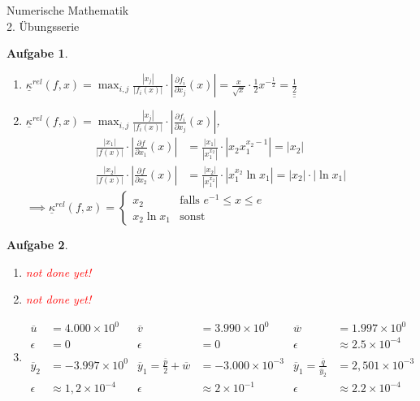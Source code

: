 \documentclass[11pt]{article}
\theoremstyle{break}
\newtheorem{task}{Aufgabe}
\newcommand{\abs}[1]{\ensuremath{\left\vert #1 \right\vert}}
\newcommand{\komp}{\ensuremath{\underline{\kappa}}}
\newcommand{\result}[1]{\ensuremath{\underline{\underline{#1}}}}
\newcommand{\ndy}{
    \textcolor{red} {\hfill not done yet!}
    \reversemarginpar
    \marginpar{\raggedleft\textcolor{red}{\rule{2mm}{2mm}}}
}
\newcommand{\hw}{2}
\begin{document}
\begin{center}
\Large{Numerische Mathematik}\\
\large{\hw. Übungsserie}
\end{center}
\begin{task}
    \hfill\vspace{-5mm}
    \begin{enumerate}[label={(\alph*)}]
        \item $\komp^{rel}(f,x) = \max_{i,j} \frac{\abs{x_j}}{\abs{f_i(x)}}\cdot\abs{\frac{\partial f_i}{\partial x_j}(x)} = \frac{x}{\sqrt{x}}\cdot \frac{1}{2} x^{-\frac{1}{2}}=\result{\frac{1}{2}}$
        \item $\komp^{rel}(f,x) = \max_{i,j} \frac{\abs{x_j}}{\abs{f_i(x)}}\cdot\abs{\frac{\partial f_i}{\partial x_j}(x)}$,
        \begin{align*}
            \frac{\abs{x_1}}{\abs{f(x)}}\cdot\abs{\frac{\partial f}{\partial x_1}(x)} &= \frac{\abs{x_1}}{\abs{x_1^{x_2}}}\cdot \abs{ x_2 x_1^{x_2 -1}}=\abs{x_2}\\
            \frac{\abs{x_2}}{\abs{f(x)}}\cdot\abs{\frac{\partial f}{\partial x_2}(x)} &= \frac{\abs{x_2}}{\abs{x_1^{x_2}}}\cdot \abs{ x_1^{x_2}\ln x_1}=\abs{x_2}\cdot\abs{\ln x_1}
        \end{align*}
        $\implies \komp^{rel}(f,x) = \begin{cases}
            x_2 & \text{falls } e^{-1} \leq x \leq e\\
            x_2\ln x_1 & \text{sonst}
        \end{cases}$
    \end{enumerate}
\end{task}
\begin{task}
    \hfill\vspace{-5mm}
    \begin{enumerate}[label={(\alph*)}]
        \item \ndy
        \item \ndy
        \item \hfill\vspace{-5mm}
        \begin{align*}
            \overline{u} &= 4.000 \times 10^0       &\overline{v}&=3.990\times 10^0                                                 & \overline{w}&=1.997 \times 10^0\\
            \epsilon &=0                            & \epsilon &=0                                                                  & \epsilon &\approx 2.5\times 10^{-4}\\\\
            \overline{y}_2 &= -3.997 \times 10^0    &\overline{y}_1 = \frac{\overline{p}}{2} + \overline{w} &= -3.000\times 10^{-3} & \overline{y}_1 = \frac{\overline{q}}{\overline{y}_2} &= 2,501\times 10^{-3}\\
            \epsilon &\approx 1,2\times 10^{-4}     &\epsilon &\approx 2\times 10^{-1}                                              & \epsilon &\approx 2.2\times 10^{-4}
        \end{align*}
    \end{enumerate}
\end{task}
\end{document}
